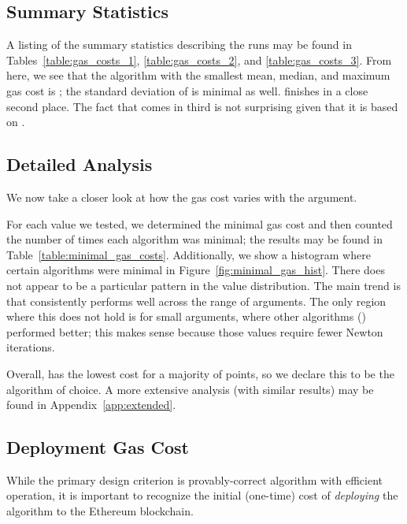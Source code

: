 \subsection{Summary Statistics}





A listing of the summary statistics describing the runs
may be found in Tables~\ref{table:gas_costs_1},
\ref{table:gas_costs_2}, and \ref{table:gas_costs_3}.
From here, we see that the algorithm with the smallest
mean, median, and maximum gas cost is \UnrolledThree{};
the standard deviation of \UnrolledThree{} is minimal as well.
\Linear{} finishes in a close second place.
The fact that \OpenZeppelinTwo{} comes in third is not surprising
given that it is based on \UnrolledThree{}.


\subsection{Detailed Analysis}

We now take a closer look at how the gas cost varies
with the argument.

For each value we tested,
we determined the minimal gas cost
and then counted the number of times each algorithm was minimal;
the results may be found in Table~\ref{table:minimal_gas_costs}.
Additionally, we show a histogram where certain algorithms
were minimal in Figure~\ref{fig:minimal_gas_hist}.
There does not appear to be a particular pattern
in the value distribution.
The main trend is that \UnrolledThree{}
consistently performs well across the range of arguments.
The only region where this does not hold is for small arguments,
where other algorithms (\while{}) performed better;
this makes sense because those values require fewer Newton iterations.

Overall, \UnrolledThree{} has the lowest cost
for a majority of points,
so we declare this to be the algorithm of choice.
A more extensive analysis (with similar results) may be found in
Appendix~\ref{app:extended}.





\subsection{Deployment Gas Cost}

While the primary design criterion is provably-correct algorithm
with efficient operation,
it is important to recognize the initial (one-time) cost
of \emph{deploying} the algorithm to the Ethereum blockchain.

